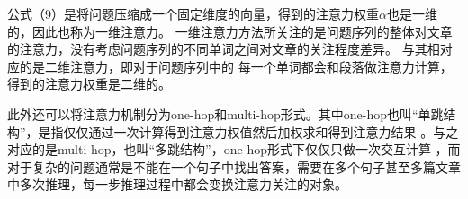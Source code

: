 公式（9）是将问题压缩成一个固定维度的向量，得到的注意力权重$\alpha$也是一维的，因此也称为一维注意力。
一维注意力方法所关注的是问题序列的整体对文章的注意力，没有考虑问题序列的不同单词之间对文章的关注程度差异。
与其相对应的是二维注意力，即对于问题序列中的
每一个单词都会和段落做注意力计算，得到的注意力权重是二维的。




此外还可以将注意力机制分为one-hop和multi-hop形式。其中one-hop也叫“单跳结构”，是指仅仅通过一次计算得到注意力权值然后加权求和得到注意力结果
。与之对应的是multi-hop，也叫“多跳结构”，one-hop形式下仅仅只做一次交互计算
，而对于复杂的问题通常是不能在一个句子中找出答案，需要在多个句子甚至多篇文章中多次推理，每一步推理过程中都会变换注意力关注的对象。

%		

